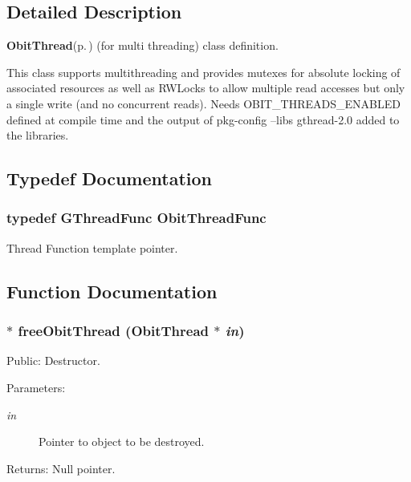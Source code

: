\subsection{Detailed Description}
{\bf Obit\-Thread}{\rm (p.\,\pageref{structObitThread})} (for multi threading) class definition. 

This class supports multithreading and provides mutexes for absolute locking of associated resources as well as RWLocks to allow multiple read accesses but only a single write (and no concurrent reads). Needs OBIT\_\-THREADS\_\-ENABLED defined at compile time and the output of pkg-config --libs gthread-2.0 added to the libraries.

\subsection{Typedef Documentation}
\subsubsection{\setlength{\rightskip}{0pt plus 5cm}typedef GThread\-Func {\bf Obit\-Thread\-Func}}\label{ObitThread_8h_a0}


Thread Function template pointer. 



\subsection{Function Documentation}
\subsubsection{$\ast$ free\-Obit\-Thread ({\bf Obit\-Thread} $\ast$ {\em in})}\label{ObitThread_8h_a2}


Public: Destructor. 

\begin{Desc}
\item[Parameters:]
\begin{description}
\item[{\em in}]Pointer to object to be destroyed. \end{description}
\end{Desc}
\begin{Desc}
\item[Returns:]Null pointer. \end{Desc}
